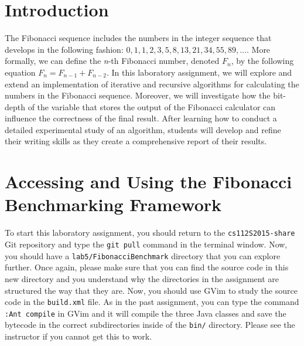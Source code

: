 


\usepackage[compact]{titlesec}


\section*{Introduction}

The Fibonacci sequence includes the numbers in the integer sequence that develops in the following fashion: $0, 1, 1,
2, 3, 5, 8, 13, 21, 34, 55, 89, \ldots$. More formally, we can define the {\em n}-th Fibonacci number, denoted $F_n$,
by the following equation $F_n = F_{n-1} + F_{n-2}$. In this laboratory assignment, we will explore and
extend an implementation of iterative and recursive algorithms for calculating the numbers in the Fibonacci sequence.
Moreover, we will investigate how the bit-depth of the variable that stores the output of the Fibonacci calculator can
influence the correctness of the final result. After learning how to conduct a detailed experimental study of an
algorithm, students will develop and refine their writing skills as they create a comprehensive report of their results.

\section*{Accessing and Using the Fibonacci Benchmarking Framework}

\begin{sloppypar} To start this laboratory assignment, you should return to the {\tt cs112S2015-share} Git repository
  and type the {\tt git pull} command in the terminal window.  Now, you should have a {\tt lab5/FibonacciBenchmark}
  directory that you can explore further.  Once again, please make sure that you can find the source code in this new
  directory and you understand why the directories in the assignment are structured the way that they are. Now, you
  should use GVim to study the source code in the {\tt build.xml} file.  As in the past assignment, you can type the
  command {\tt :Ant compile} in GVim and it will compile the three Java classes and save the bytecode in the correct
  subdirectories inside of the {\tt bin/} directory.  Please see the instructor if you cannot get this to work.
\end{sloppypar}

